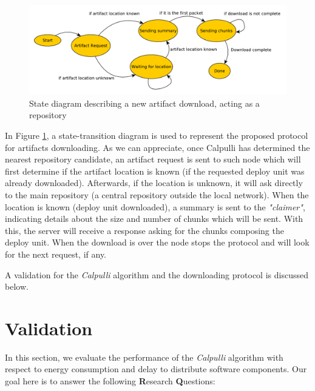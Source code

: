 \begin{figure}[]
	\centering
	\includegraphics[width=0.98\columnwidth]{chapters/calpulli.images/calpulliProtocol.pdf}
	\caption{State diagram describing a new artifact download, acting as a repository} \label{fig:calpulliProtocol}
\end{figure}

In Figure \ref{fig:calpulliProtocol}, a state-transition diagram is used to represent the proposed protocol for artifacts downloading.
As we can appreciate, once Calpulli has determined the nearest repository candidate, an artifact request is sent to such node which will first determine if the artifact location is known (if the requested deploy unit was already downloaded). Afterwards, if the location is unknown, it will ask directly to the main repository (a central repository outside the local network).
When the location is known (deploy unit downloaded), a summary is sent to the \textit{"claimer"}, indicating details about the size and number of chunks which will be sent.
With this, the server will receive a response asking for the chunks composing the deploy unit.
When the download is over the node stops the protocol and will look for the next request, if any.

A validation for the \textit{Calpulli} algorithm and the downloading protocol is discussed below.



\section{Validation}
In this section, we evaluate the performance of the \textit{Calpulli} algorithm with respect to energy consumption and delay to distribute software components.
Our goal here is to answer the following \textbf{R}esearch \textbf{Q}uestions: 


